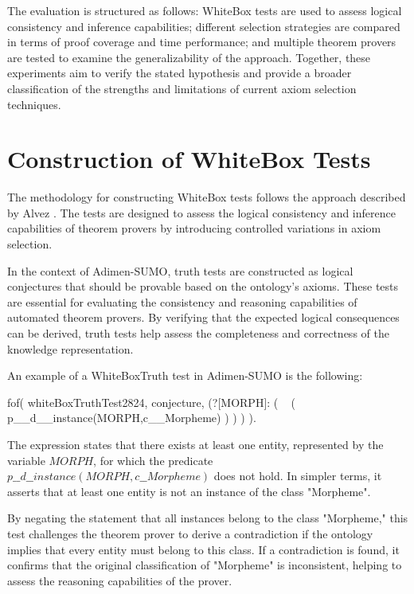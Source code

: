 \documentclass[english,version-2020-11]{uzl-thesis}
\begin{document}
The evaluation is structured as follows: WhiteBox tests are used to assess logical consistency and inference capabilities; different selection strategies are compared in terms of proof coverage and time performance; and multiple theorem provers are tested to examine the generalizability of the approach. Together, these experiments aim to verify the stated hypothesis and provide a broader classification of the strengths and limitations of current axiom selection techniques.


\section{Construction of WhiteBox Tests}

The methodology for constructing WhiteBox tests follows the approach described by Alvez \cite{Alvez2017}. The tests are designed to assess the logical consistency and inference capabilities of theorem provers by introducing controlled variations in axiom selection.

In the context of Adimen-SUMO, truth tests are constructed as logical conjectures that should be provable based on the ontology's axioms. These tests are essential for evaluating the consistency and reasoning capabilities of automated theorem provers. By verifying that the expected logical consequences can be derived, truth tests help assess the completeness and correctness of the knowledge representation. 

An example of a WhiteBoxTruth test in Adimen-SUMO is the following:

\begin{Pseudocode}[morekeywords = {add, create}, deletekeywords={to}, numbers=left,
    caption = {WhiteboxTruthTest example}]
    fof( whiteBoxTruthTest2824, conjecture,
        (?[MORPH]: 
            (
                ~ (
                    p__d__instance(MORPH,c__Morpheme)
                )
            )
        )
    ).
\end{Pseudocode}


The expression states that there exists at least one entity, represented by the variable \( MORPH \), for which the predicate \( p\_\_d\_\_instance(MORPH, c\_\_Morpheme) \) does not hold. In simpler terms, it asserts that at least one entity is not an instance of the class "Morpheme".

By negating the statement that all instances belong to the class "Morpheme," this test challenges the theorem prover to derive a contradiction if the ontology implies that every entity must belong to this class. If a contradiction is found, it confirms that the original classification of "Morpheme" is inconsistent, helping to assess the reasoning capabilities of the prover.
\end{document}
